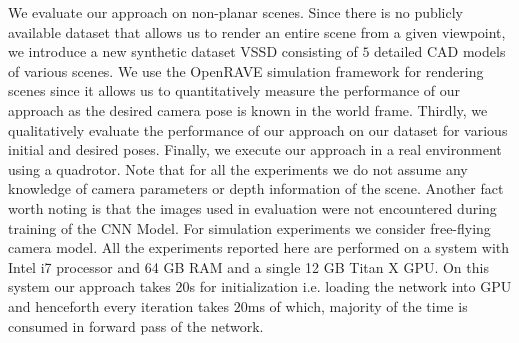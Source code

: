 \documentclass[usletter, 10 pt, conference]{ieeeconf}  %
\begin{document}
 We evaluate our approach on non-planar scenes. Since there is no publicly available dataset that allows us to render an entire scene from a given viewpoint, we introduce a new synthetic dataset VSSD consisting of $5$ detailed CAD models of various scenes. We use the OpenRAVE simulation framework \cite{openrave} for rendering scenes since it  allows us to quantitatively measure the performance of our approach as the desired camera pose is known in the world frame. Thirdly, we qualitatively evaluate the performance of our approach on our dataset for various initial and desired poses. Finally, we execute our approach in a real environment using a quadrotor. Note that for all the experiments we do not assume any knowledge of camera parameters or depth information of the scene. Another fact worth noting is that the images used in evaluation were not encountered during training of the CNN Model. For simulation experiments we consider free-flying camera model. All the experiments reported here are performed on a system with Intel i7 processor and 64 GB RAM and a single 12 GB Titan X GPU. On this system our approach takes $20$s for initialization i.e. loading the network into GPU and henceforth every iteration takes $20$ms of which, majority of the time is consumed in forward pass of the network.  %
\end{document}
